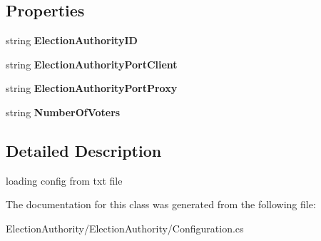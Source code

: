 \subsection*{Properties}
\begin{DoxyCompactItemize}
\item 
\hypertarget{class_election_authority_1_1_configuration_ac7c904d1ab2e25b350016093f0f51e17}{}string {\bfseries Election\+Authority\+I\+D}\label{class_election_authority_1_1_configuration_ac7c904d1ab2e25b350016093f0f51e17}

\item 
\hypertarget{class_election_authority_1_1_configuration_a4d2632fc7e7a8351f5f392c1e7e20cc1}{}string {\bfseries Election\+Authority\+Port\+Client}\label{class_election_authority_1_1_configuration_a4d2632fc7e7a8351f5f392c1e7e20cc1}

\item 
\hypertarget{class_election_authority_1_1_configuration_a560f3427f69d9c845b07ee06684c3530}{}string {\bfseries Election\+Authority\+Port\+Proxy}\label{class_election_authority_1_1_configuration_a560f3427f69d9c845b07ee06684c3530}

\item 
\hypertarget{class_election_authority_1_1_configuration_ae581a3a4b33a68b9fdfd62858ce6d1ab}{}string {\bfseries Number\+Of\+Voters}\label{class_election_authority_1_1_configuration_ae581a3a4b33a68b9fdfd62858ce6d1ab}

\end{DoxyCompactItemize}


\subsection{Detailed Description}
loading config from txt file 



The documentation for this class was generated from the following file\+:\begin{DoxyCompactItemize}
\item 
Election\+Authority/\+Election\+Authority/Configuration.\+cs\end{DoxyCompactItemize}
